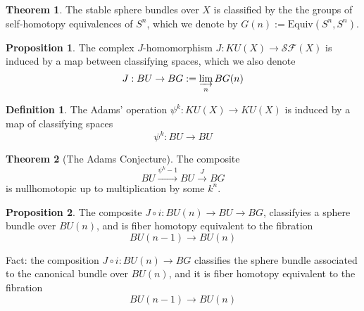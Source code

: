 \documentclass{article}
\theoremstyle{definition}
\newtheorem{theorem}{Theorem}[section]
\theoremstyle{definition}
\newtheorem{definition}{Definition}[theorem]
\theoremstyle{definition}
\theoremstyle{definition}
\newtheorem{proposition}{Proposition}[theorem]
\theoremstyle{definition}
\theoremstyle{definition}
\theoremstyle{definition}
\begin{document}
\begin{tcolorbox}[colback=red!5!white,colframe=red!30!white]
\begin{theorem}
The stable sphere bundles over $X$ is classified by the the groups of self-homotopy equivalences of $S^n$, which we denote by $G(n):=\textrm{Equiv}(S^n,S^n)$. 
\end{theorem}
\end{tcolorbox}


\begin{tcolorbox}[colback=blue!5!white,colframe=blue!30!white]
\begin{proposition}
The complex $J$-homomorphism $J: KU(X)\to \mathcal{SF}(X)$ is induced by a map between classifying spaces, which we also denote 
\[J: BU\to BG:=\varinjlim_{n} BG(n)\]
\end{proposition}
\end{tcolorbox}


\begin{tcolorbox}[colback=purple!5!white,colframe=purple!75!black]
\begin{definition}
The Adams' operation $\psi^k: KU(X)\to KU(X)$ is induced by a map of classifying spaces
\[\psi^k: BU\to BU\]
\end{definition}
\end{tcolorbox}


\begin{tcolorbox}[colback=red!5!white,colframe=red!30!white]
\begin{theorem}[The Adams Conjecture]
The composite 
\[BU\xrightarrow{\psi^k-1}BU\xrightarrow{J}BG\]
is nullhomotopic up to multiplication by some $k^n$. 
\end{theorem}
\end{tcolorbox}


\begin{tcolorbox}[colback=blue!5!white,colframe=blue!30!white]
\begin{proposition}
The composite $J\circ i: BU(n)\to BU\to BG$, classifyies a sphere bundle over $BU(n)$, and is fiber homotopy equivalent to the fibration 
\[BU(n-1)\to BU(n)\]
\end{proposition}
\end{tcolorbox}

Fact: the composition $J\circ i: BU(n)\to BG$ classifies the sphere bundle associated to the canonical bundle over $BU(n)$, and it is fiber homotopy equivalent to the fibration 
\[BU(n-1)\to BU(n)\]
\end{document}
